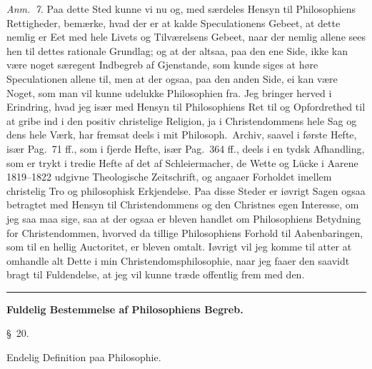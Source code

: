 \documentclass[12pt,a4paper]{book}
\newcommand{\grouphead}[1]{%
  \bigskip\begin{center}\large\textbf{#1}\end{center}\smallskip}
\newcommand{\apage}[1]{\marginnote{\footnotesize\textit{[#1]}}}
\begin{document}
{\small\emph{Anm.~7.} Paa dette Sted kunne vi nu og, med særdeles Hensyn til
Philosophiens Rettigheder, bemærke, hvad der er at kalde Speculationens Gebeet, at
dette nemlig er Eet med hele Livets og Tilværelsens Gebeet, naar der nemlig allene
sees hen til dettes rationale Grundlag; og at der altsaa, paa den ene Side, ikke kan
være noget særegent Indbegreb af Gjenstande, som kunde siges at høre Speculationen
allene til, men at der ogsaa, paa den anden Side, ei kan være Noget, som man vil
kunne udelukke Philosophien fra. Jeg bringer herved i Erindring, hvad jeg især med
Hensyn til Philosophiens Ret til og Opfordrethed til at gribe ind i den positiv
christelige Religion, ja i Christendommens hele Sag og dens hele Værk, har fremsat
deels i mit Philosoph.\ Archiv, saavel i første Hefte, især Pag.\ 71 ff., som i
fjerde Hefte, især Pag.\ 364 ff., deels i en tydsk Afhandling, som er trykt i tredie
Hefte af det af Schleiermacher, de Wette og Lücke i Aarene 1819--1822 udgivne
Theologische Zeitschrift, og angaaer Forholdet imellem christelig Tro og philosophisk
Erkjendelse. Paa disse Steder er iøvrigt Sagen ogsaa betragtet med Hensyn til
Christendommens og den Christnes egen Interesse, om jeg saa maa sige, saa at der ogsaa
er bleven handlet om Philosophiens Betydning for Christendommen, hvorved da tillige
Philosophiens Forhold til Aabenbaringen, som til en hellig Auctoritet, er bleven
omtalt. Iøvrigt vil jeg komme til atter at omhandle alt Dette i min
Christendomsphilosophie, naar jeg faaer den saavidt bragt til Fuldendelse, at jeg vil
kunne træde offentlig frem med den.\par}

\begin{center}\rule{0.18\linewidth}{0.4pt}\end{center}

\grouphead{Fuldelig Bestemmelse af Philosophiens Begreb.}

\begin{center}\large\S~20.\end{center}
 \apage{81} 
\begin{center}Endelig Definition paa Philosophie.\end{center}
\end{document}
